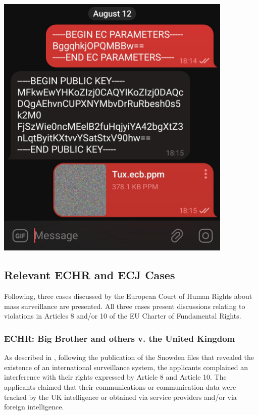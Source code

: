 \begin{minipage}{0.4\textwidth}
    \centering
    \includegraphics[keepaspectratio,width=0.85\textwidth]{05-results/img/enc_chat.jpg}
\end{minipage}

\subsection{Relevant ECHR and ECJ Cases}

Following, three cases discussed by the European Court of Human Rights about mass surveillance are presented. All three cases present discussions relating to violations in Articles 8 and/or 10 of the EU Charter of Fundamental Rights.

\subsubsection{ECHR: Big Brother and others v. the United Kingdom}
\label{ss:big_brother}

As described in \cite{big_brother}, following the publication of the Snowden files that revealed the existence of an international surveillance system, the applicants complained an interference with their rights expressed by Article 8 and Article 10. The applicants claimed that their communications or communication data were tracked by the UK intelligence or obtained via service providers and/or via foreign intelligence.

